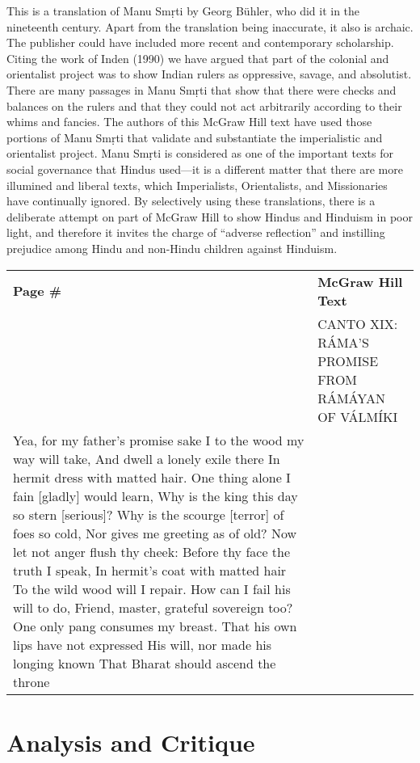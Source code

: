 This is a translation of Manu Smṛti by Georg Bühler, who did it in the nineteenth century. Apart from the translation being inaccurate, it also is archaic. The publisher could have included more recent and contemporary scholarship. Citing the work of Inden (1990) we have argued that part of the colonial and orientalist project was to show Indian rulers as oppressive, savage, and absolutist. There are many passages in Manu Smṛti that show that there were checks and balances on the rulers and that they could not act arbitrarily according to their whims and fancies. The authors of this McGraw Hill text have used those portions of Manu Smṛti that validate and substantiate the imperialistic and orientalist project. Manu Smṛti is considered as one of the important texts for social governance that Hindus used—it is a different matter that there are more illumined and liberal texts, which Imperialists, Orientalists, and Missionaries have continually ignored. By selectively using these translations, there is a deliberate attempt on part of McGraw Hill to show Hindus and Hinduism in poor light, and therefore it invites the charge of “adverse reflection” and instilling prejudice among Hindu and non-Hindu children against Hinduism.

\begin{longtable}{|>{\raggedleft}p{1.5cm}|p{8.5cm}|}
\multicolumn{2}{c}{\textbf{Table: 6}}\\ 
\hline
\textbf{Page \#} & \textbf{McGraw Hill Text} \tabularnewline
\hline 
281 & \raggedright CANTO XIX: RÁMA’S PROMISE FROM RÁMÁYAN OF VÁLMÍKI\\ Yea, for my father’s promise sake I to the wood my way will take, And dwell a lonely exile there In hermit dress with matted hair. One thing alone I fain [gladly] would learn, Why is the king this day so stern [serious]? Why is the scourge [terror] of foes so cold, Nor gives me greeting as of old? Now let not anger flush thy cheek: Before thy face the truth I speak, In hermit’s coat with matted hair To the wild wood will I repair. How can I fail his will to do, Friend, master, grateful sovereign too? One only pang consumes my breast. That his own lips have not expressed His will, nor made his longing known That Bharat should ascend the throne\tabularnewline
\hline
\end{longtable}

\section*{Analysis and Critique} 

